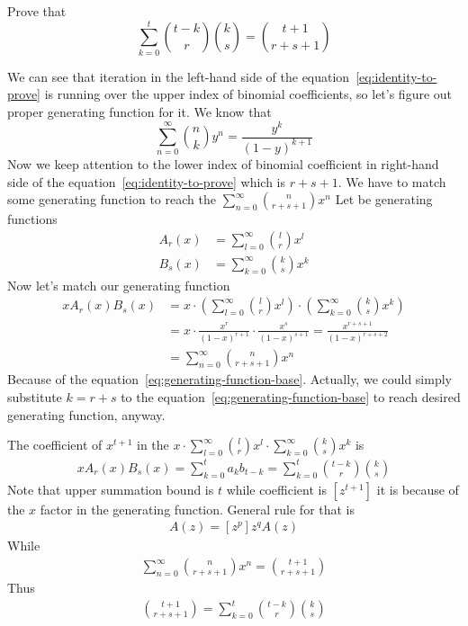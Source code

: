 ﻿\documentclass{article}
\begin{document}
    Prove that
    \begin{equation}
        \sum_{k=0}^{t} \binom{t-k}{r} \binom{k}{s} = \binom{t+1}{r+s+1}\label{eq:identity-to-prove}
    \end{equation}

    We can see that iteration in the left-hand side of the equation~\eqref{eq:identity-to-prove} is running
    over the upper index of binomial coefficients, so let's figure out proper generating function for it.
    We know that
    \begin{equation}
        \sum_{n=0}^{\infty} \binom{n}{k} y^n = \frac{y^k}{(1-y)^{k+1}}\label{eq:generating-function-base}
    \end{equation}
    Now we keep attention to the lower index of binomial coefficient in right-hand side
    of the equation~\eqref{eq:identity-to-prove} which is $r+s+1$.
    We have to match some generating function to reach the $\sum_{n=0}^{\infty} \binom{n}{r+s+1} x^n$
    Let be generating functions
    \begin{align*}
        A_r(x) &= \sum_{l=0}^{\infty} \binom{l}{r} x^l\\
        B_s(x) &= \sum_{k=0}^{\infty} \binom{k}{s} x^k
    \end{align*}
    Now let's match our generating function
    \begin{align*}
        x A_r(x) B_s(x)
        &= x \cdot \left( \sum_{l=0}^{\infty} \binom{l}{r} x^l \right) \cdot \left( \sum_{k=0}^{\infty} \binom{k}{s} x^k \right) \\
        &= x \cdot \frac{x^r}{(1-x)^{r+1}} \cdot \frac{x^s}{(1-x)^{s+1}} = \frac{x^{r+s+1}}{(1-x)^{r+s+2}} \\
        &= \sum_{n=0}^{\infty} \binom{n}{r+s+1} x^n
    \end{align*}
    Because of the equation~\eqref{eq:generating-function-base}.
    Actually, we could simply substitute $k=r+s$ to the equation~\eqref{eq:generating-function-base} to reach desired
    generating function, anyway.

    The coefficient of $x^{t+1}$ in the $x \cdot \sum_{l=0}^{\infty} \binom{l}{r} x^l \cdot \sum_{k=0}^{\infty} \binom{k}{s} x^k$ is
    \begin{align*}
    [x^{t+1}]
        x A_r(x) B_s(x) = \sum_{k=0}^{t} a_k b_{t-k} = \sum_{k=0}^{t} \binom{t-k}{r} \binom{k}{s}
    \end{align*}
    Note that upper summation bound is $t$ while coefficient is $[z^{t+1}]$ it is because of the $x$ factor in the generating function.
    General rule for that is
    \begin{align*}
    [z^{p-q}]A(z)=[z^p]z^qA(z)
    \end{align*}
    While
    \begin{align*}
    [z^{t+1}]
        \sum_{n=0}^{\infty} \binom{n}{r+s+1} x^n = \binom{t+1}{r+s+1}
    \end{align*}
    Thus
    \begin{align*}
        \binom{t+1}{r+s+1} = \sum_{k=0}^{t} \binom{t-k}{r} \binom{k}{s}
    \end{align*}
\end{document}
